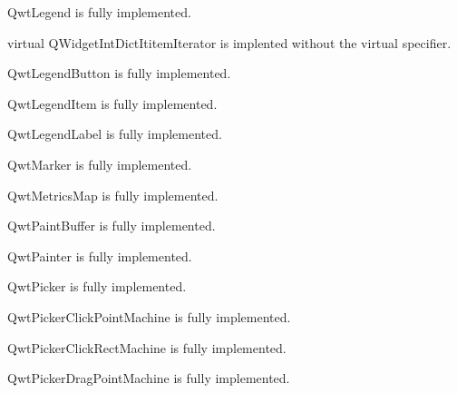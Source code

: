 \documentclass{manual}
\begin{document}
\begin{classdesc*}{QwtLegend}
  is fully implemented.

  \begin{cfuncdesc}{virtual QWidgetIntDictIt}{itemIterator}{}
    is implented without the virtual specifier.
  \end{cfuncdesc}
\end{classdesc*}

\begin{classdesc*}{QwtLegendButton}
  is fully implemented.
\end{classdesc*}

\begin{classdesc*}{QwtLegendItem}
  is fully implemented.
\end{classdesc*}

\begin{classdesc*}{QwtLegendLabel}
  is fully implemented.
\end{classdesc*}

\begin{classdesc*}{QwtMarker}
  is fully implemented.
\end{classdesc*}

\begin{classdesc*}{QwtMetricsMap}
  is fully implemented.
\end{classdesc*}

\begin{classdesc*}{QwtPaintBuffer}
  is fully implemented.
\end{classdesc*}

\begin{classdesc*}{QwtPainter}
  is fully implemented.
\end{classdesc*}

\begin{classdesc*}{QwtPicker}
  is fully implemented.
\end{classdesc*}

\begin{classdesc*}{QwtPickerClickPointMachine}
  is fully implemented.
\end{classdesc*}

\begin{classdesc*}{QwtPickerClickRectMachine}
  is fully implemented.
\end{classdesc*}

\begin{classdesc*}{QwtPickerDragPointMachine}
  is fully implemented.
\end{classdesc*}
\end{document}
